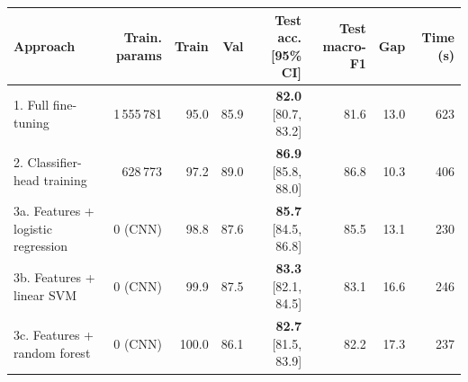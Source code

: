 \begin{tabular}{lrrrrrrr}
\toprule
Approach & Train. params & Train & Val & Test acc. [95\% CI] & Test macro-F1 & Gap & Time (s) \\
\midrule
1. Full fine-tuning & 1\,555\,781 & 95.0 & 85.9 & \textbf{82.0} [80.7, 83.2] & 81.6 & 13.0 & 623 \\
2. Classifier-head training & 628\,773 & 97.2 & 89.0 & \textbf{86.9} [85.8, 88.0] & 86.8 & 10.3 & 406 \\
3a. Features + logistic regression & 0 (CNN) & 98.8 & 87.6 & \textbf{85.7} [84.5, 86.8] & 85.5 & 13.1 & 230 \\
3b. Features + linear SVM & 0 (CNN) & 99.9 & 87.5 & \textbf{83.3} [82.1, 84.5] & 83.1 & 16.6 & 246 \\
3c. Features + random forest & 0 (CNN) & 100.0 & 86.1 & \textbf{82.7} [81.5, 83.9] & 82.2 & 17.3 & 237 \\
\bottomrule
\end{tabular}